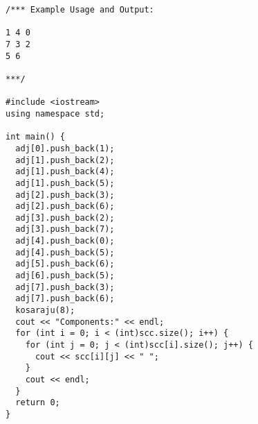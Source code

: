 \begin{lstlisting}
/*** Example Usage and Output:

1 4 0
7 3 2
5 6

***/

#include <iostream>
using namespace std;

int main() {
  adj[0].push_back(1);
  adj[1].push_back(2);
  adj[1].push_back(4);
  adj[1].push_back(5);
  adj[2].push_back(3);
  adj[2].push_back(6);
  adj[3].push_back(2);
  adj[3].push_back(7);
  adj[4].push_back(0);
  adj[4].push_back(5);
  adj[5].push_back(6);
  adj[6].push_back(5);
  adj[7].push_back(3);
  adj[7].push_back(6);
  kosaraju(8);
  cout << "Components:" << endl;
  for (int i = 0; i < (int)scc.size(); i++) {
    for (int j = 0; j < (int)scc[i].size(); j++) {
      cout << scc[i][j] << " ";
    }
    cout << endl;
  }
  return 0;
}
\end{lstlisting}
